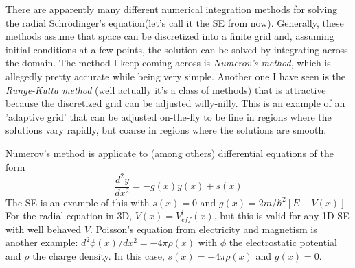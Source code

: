 \documentclass[prb,aps,11pt,superscriptaddress,floatfix]{revtex4-2}
\begin{document}
There are apparently many different numerical integration methods for solving the radial Schr\"odinger's equation(let's call it the SE from now). Generally, these methods assume that space can be discretized into a finite grid and, assuming initial conditions at a few points, the solution can be solved by integrating across the domain. The method I keep coming across is \emph{Numerov's method}, which is allegedly pretty accurate while being very simple. Another one I have seen is the \emph{Runge-Kutta method} (well actually it's a class of methods) that is attractive because the discretized grid can be adjusted willy-nilly. This is an example of an 'adaptive grid' that can be adjusted on-the-fly to be fine in regions where the solutions vary rapidly, but coarse in regions where the solutions are smooth.

Numerov's method is applicate to (among others) differential equations of the form 
\begin{equation}
    \frac{d^2y}{dx^2} = -g(x)y(x)+s(x)
\end{equation}
The SE is an example of this with $s(x)=0$ and $g(x)=2m/\hbar^2 \left[ E-V(x) \right]$. For the radial equation in 3D, $V(x)=V^l_{eff}(x)$, but this is valid for any 1D SE with well behaved $V$. Poisson's equation from electricity and magnetism is another example: $d^2\phi(x)/dx^2=-4\pi\rho(x)$ with $\phi$ the electrostatic potential and $\rho$ the charge density. In this case, $s(x)=-4\pi\rho(x)$ and $g(x)=0$.
\end{document}
